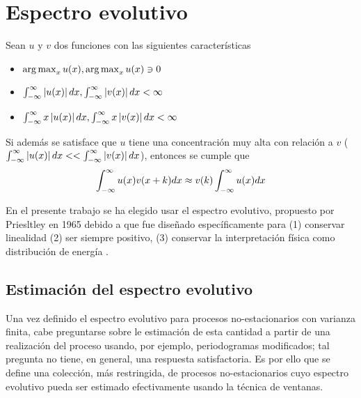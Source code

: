 
\chapter{Espectro evolutivo}

\begin{proposicion}
Sean $u$ y $v$ dos funciones con las siguientes características
\begin{itemize}
\item $\operatorname{arg\,max}_x u(x), \operatorname{arg\,max}_x u(x) \ni 0$
\item $\int_{-\infty}^{\infty} \left| u(x) \right| dx, \int_{-\infty}^{\infty} \left| v(x) \right| dx < \infty$
\item $\int_{-\infty}^{\infty} x\left| u(x) \right| dx, \int_{-\infty}^{\infty} x\left| v(x) \right| dx < \infty$
\end{itemize} 
Si además se satisface que $u$ tiene una {concentración} muy alta con relación a $v$
($ \int_{-\infty}^{\infty} \left| u(x) \right| dx << \int_{-\infty}^{\infty} \left| v(x) \right| dx $),
entonces se cumple que
\begin{equation*}
\int_{-\infty}^{\infty} u(x) v(x+k) dx \approx v(k) \int_{-\infty}^{\infty} u(x) dx
\end{equation*}
\label{pseudo_d}
\end{proposicion}

En el presente trabajo se ha elegido usar el espectro evolutivo, propuesto por Priesltley en
1965 \cite{Priestley65} debido a que fue diseñado específicamente para (1) conservar linealidad 
(2) ser siempre positivo, (3) conservar la interpretación física como distribución de energía
\cite{Loynes68}.


\section{Estimación del espectro evolutivo}

Una vez definido el espectro evolutivo para procesos no-estacionarios con varianza finita, cabe 
preguntarse sobre le estimación de esta cantidad a partir de una realización del proceso usando, 
por ejemplo, periodogramas modificados; tal pregunta no tiene, en general, una respuesta 
satisfactoria.
Es por ello que se define una colección, más restringida, de procesos no-estacionarios cuyo 
espectro evolutivo pueda ser estimado efectivamente usando la técnica de ventanas.

